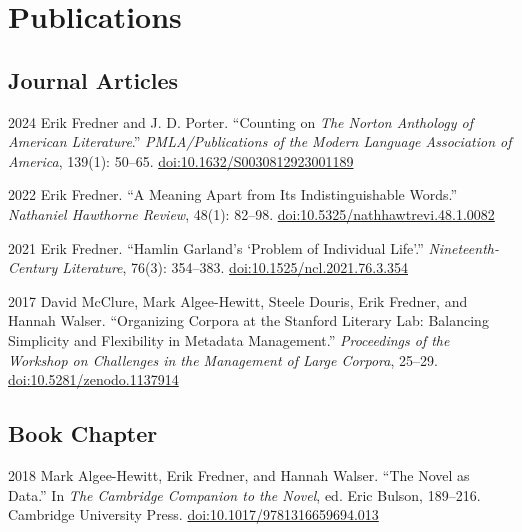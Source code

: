 \documentclass[12pt,letterpaper]{report}
\begin{document}
\section*{Publications}

\subsection*{Journal Articles}

\begin{tablist}
	\item[2024] \tab{}Erik Fredner and J. D. Porter. \enquote{Counting on \textit{The Norton Anthology of American Literature}.} \textit{PMLA/Publications of the Modern Language Association of America}, 139(1): 50--65. \href{https://doi.org/10.1632/S0030812923001189}{doi:10.1632/S0030812923001189}
	\item[2022] \tab{}Erik Fredner. \enquote{A Meaning Apart from Its Indistinguishable Words.} \textit{Nathaniel Hawthorne Review}, 48(1): 82--98. \href{https://doi.org/10.5325/nathhawtrevi.48.1.0082}{doi:10.5325/nathhawtrevi.48.1.0082}
	\item[2021] \tab{}Erik Fredner. \enquote{Hamlin Garland's ‘Problem of Individual Life’.} \textit{Nineteenth-Century Literature}, 76(3): 354--383. \href{https://doi.org/10.1525/ncl.2021.76.3.354}{doi:10.1525/ncl.2021.76.3.354}
	\item[2017] \tab{}David McClure, Mark Algee-Hewitt, Steele Douris, Erik Fredner, and Hannah Walser. \enquote{Organizing Corpora at the Stanford Literary Lab: Balancing Simplicity and Flexibility in Metadata Management.} \textit{Proceedings of the Workshop on Challenges in the Management of Large Corpora}, 25--29. \href{https://ids-pub.bsz-bw.de/frontdoor/index/index/docId/6261}{doi:10.5281/zenodo.1137914}
\end{tablist}

\subsection*{Book Chapter}

\begin{tablist}
	\item[2018] \tab{}Mark Algee-Hewitt, Erik Fredner, and Hannah Walser. \enquote{The Novel as Data.} In \textit{The Cambridge Companion to the Novel}, ed. Eric Bulson, 189--216. Cambridge University Press. \href{https://doi.org/10.1017/9781316659694.013}{doi:10.1017/9781316659694.013}
\end{tablist}
\end{document}
